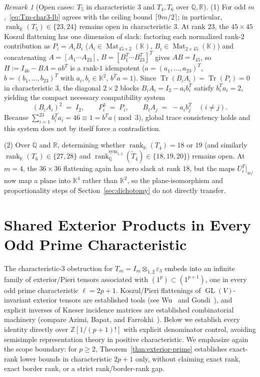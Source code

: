 \documentclass[11pt,reqno]{amsart}
\theoremstyle{definition}
\theoremstyle{remark}
\newtheorem{remark}[theorem]{Remark}
\numberwithin{equation}{section}
\newcommand{\KK}{\mathbb{K}}
\newcommand{\QQ}{\mathbb{Q}}
\newcommand{\RR}{\mathbb{R}}
\newcommand{\ZZ}{\mathbb{Z}}
\DeclareMathOperator{\rk}{rank}
\DeclareMathOperator{\Mat}{Mat}
\DeclareMathOperator{\GL}{GL}
\DeclareMathOperator{\Tr}{Tr}
\begin{document}
\begin{remark}[Open cases: $T_5$ in characteristic $3$ and $T_4, T_6$ over $\QQ, \RR$]\label{rem:open-m4}
(1) For odd $m$,~\eqref{eq:Tm-char3-lb} agrees with the ceiling bound $\lceil 9m/2 \rceil$; in particular, $\rk_{\KK}(T_5) \in \{23, 24\}$ remains open in characteristic $3$. At rank $23$, the $45 \times 45$ Koszul flattening has one dimension of slack: factoring each normalized rank-$2$ contribution as $P_i = A_i B_i$ ($A_i \in \Mat_{45 \times 2}(\KK)$, $B_i \in \Mat_{2 \times 45}(\KK)$) and concatenating $A = [A_1 \cdots A_{23}]$, $B = [B_1^T \cdots B_{23}^T]^T$ gives $A B = I_{45}$, so $H := I_{46} - B A = a b^T$ is a rank-$1$ idempotent ($a = (a_1, \dots, a_{23})^T$, $b = (b_1, \dots, b_{23})^T$ with $a_i, b_i \in \KK^2$, $b^T a = 1$). Since $\Tr(B_i A_i) = \Tr(P_i) = 0$ in characteristic $3$, the diagonal $2 \times 2$ blocks $B_i A_i = I_2 - a_i b_i^T$ satisfy $b_i^T a_i = 2$, yielding the compact necessary compatibility system
\[
  (B_i A_i)^2 \;=\; I_2, \qquad P_i^3 \;=\; P_i, \qquad B_i A_j \;=\; -a_i b_j^T \quad (i \neq j).
\]
Because $\sum_{i=1}^{23} b_i^T a_i = 46 \equiv 1 = b^T a \pmod 3$, global trace consistency holds and this system does not by itself force a contradiction.

(2) Over $\QQ$ and $\RR$, determining whether $\rk_{\KK}(T_4) = 18$ or $19$ (and similarly $\rk_{\KK}(T_6) \in \{27, 28\}$ and $\rk_{\QQ}^{\mathrm{sym}_{1,2}}(\widetilde{T}_4) \in \{18, 19, 20\}$) remains open. At $m = 4$, the $36 \times 36$ flattening again has zero slack at rank $18$, but the maps $U_r^T|_{w_r^\perp}$ now map a plane into $\KK^4$ rather than $\KK^2$, so the plane-isomorphism and proportionality steps of Section~\ref{sec:dichotomy} do not directly transfer.
\end{remark}

\section{Shared Exterior Products in Every Odd Prime Characteristic}\label{sec:exterior}

The characteristic-$3$ obstruction for $T_m = I_m \otimes_{1,2} \varepsilon_3$ embeds into an infinite family of exterior/Pieri tensors associated with $(1^p) \subset (1^{p+1})$, one in every odd prime characteristic $\ell = 2p + 1$. Koszul/Pieri flattenings of $\GL(V)$-invariant exterior tensors are established tools (see Wu~\cite{Wu2024} and Gondi~\cite{Gondi2025}), and explicit inverses of Kneser incidence matrices are established combinatorial machinery (compare Azimi, Bapat, and Farrokhi~\cite[Section~2]{ABF2023}). Below we establish every identity directly over $\ZZ[1/(p+1)!]$ with explicit denominator control, avoiding semisimple representation theory in positive characteristic. We emphasize again the scope boundary: for $p \ge 2$, Theorem~\ref{thm:exterior-prime} establishes exact-rank lower bounds in characteristic $2p + 1$ only, without claiming exact rank, exact border rank, or a strict rank/border-rank gap.
\end{document}

